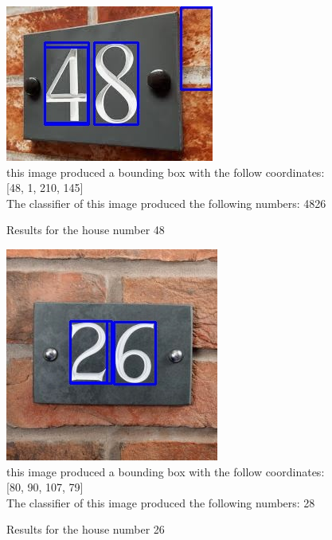 \documentclass[
	12pt, %
]{fphw}
\begin{document}
\begin{figure}[htp]
	\begin{problem}
	\begin{center}
	\includegraphics[width=0.25\linewidth]{"output/DetectedArea3"}
	\\this image produced a bounding box with the follow coordinates: [48, 1, 210, 145]\\
	The classifier of this image produced the following numbers: 4826

	\end{center}
	\end{problem}
	\caption{Results for the house number 48}
	\label{Results for the house number 48}
\end{figure}

\begin{figure}[htp]
	\begin{problem}
	\begin{center}
	\includegraphics[width=0.25\linewidth]{"output/DetectedArea4"}
	\\this image produced a bounding box with the follow coordinates: [80, 90, 107, 79]\\
	The classifier of this image produced the following numbers: 28

	\end{center}
	\end{problem}
	\caption{Results for the house number 26}
	\label{Results for the house number 26}
\end{figure}
\end{document}
